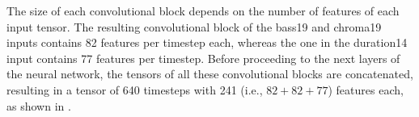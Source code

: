 
The size of each convolutional block depends on the number
of features of each input tensor. The resulting
convolutional block of the \gls{bass19} and \gls{chroma19}
inputs contains 82 features per timestep each, whereas the
one in the \gls{duration14} input contains 77 features per
timestep. Before proceeding to the next layers of the neural
network, the tensors of all these convolutional blocks are
concatenated, resulting in a tensor of 640 timesteps with
241 (i.e., $82+82+77$) features each, as shown in
.
